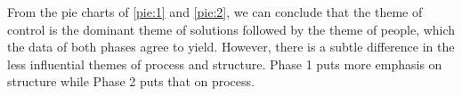 From the pie charts of \ref{pie:1} and \ref{pie:2}, we can conclude that the theme of control is the dominant theme of solutions followed by the theme of people, which the data of both phases agree to yield. However, there is a subtle difference in the less influential themes of process and structure. Phase 1 puts more emphasis on structure while Phase 2 puts that on process.

\begin{comment}
\section{Comparison}

In this section, a comparison is made to investigate the correlation and the differences of our findings and the Thai business case study. We identify the findings of our sources and our evaluation framework. Correlations are listed as subsection headings.

\subsection{Governance}

In the Thai business case study, the authors argue that risk management can be well developed if both ICT governance and Information security governance
\end{comment}